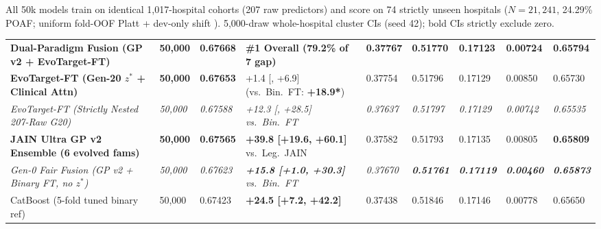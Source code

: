 \documentclass[8.5pt,letterpaper]{article}
\begin{document}

{\noindent\sffamily\fontsize{6.6}{8.1}\selectfont\color{sub}All 50k models train on identical 1,017-hospital cohorts (207 raw predictors) and score on 74 strictly unseen hospitals ($N=21{,}241$, 24.29\% POAF; uniform fold-OOF Platt + dev-only shift ). 5,000-draw whole-hospital cluster CIs (seed 42); bold CIs strictly exclude zero.\par}

\vspace{2.2pt}
\noindent
{\fontsize{7.0}{8.6}\selectfont\setlength{\tabcolsep}{2.5pt}
\begin{tabularx}{\textwidth}{@{}Y R{1.00cm} R{1.06cm} R{2.85cm} R{1.00cm} R{1.02cm} R{0.96cm} R{0.96cm} R{1.00cm}@{}}
\toprule
{} &  &  &  &  &  &  &  &  \\
\midrule
{}
\textbf{Dual-Paradigm Fusion (GP v2 + EvoTarget-FT)} & \textbf{50,000} & \textbf{0.67668} & \textbf{\#1 Overall (79.2\% of 7\x{} gap)} & \textbf{0.37767} & \textbf{0.51770} & \textbf{0.17123} & \textbf{0.00724} & \textbf{0.65794} \\
\textbf{\color{accent}EvoTarget-FT (Gen-20 $z^*$ + Clinical Attn)} & \textbf{50,000} & \textbf{0.67653} & +1.4 [, +6.9] (vs.\ Bin.\ FT: \textbf{+18.9*}) & 0.37754 & 0.51796 & 0.17129 & 0.00850 & 0.65730 \\
\textit{EvoTarget-FT (Strictly Nested 207-Raw G20)} & \textit{50,000} & \textit{0.67588} & \textit{+12.3 [, +28.5] vs.\ Bin.\ FT} & \textit{0.37637} & \textit{0.51797} & \textit{0.17129} & \textit{0.00742} & \textit{0.65535} \\
\textbf{\color{teal}JAIN Ultra GP v2 Ensemble (6 evolved fams)} & \textbf{50,000} & \textbf{0.67565} & \textbf{+39.8 [+19.6, +60.1]} vs.\ Leg.\ JAIN & 0.37582 & 0.51793 & 0.17135 & 0.00805 & \textbf{0.65809} \\
\textit{Gen-0 Fair Fusion (GP v2 + Binary FT, no $z^*$)} & \textit{50,000} & \textit{0.67623} & \textit{\textbf{+15.8 [+1.0, +30.3]} vs.\ Bin.\ FT} & \textit{0.37670} & \textit{\textbf{0.51761}} & \textit{\textbf{0.17119}} & \textit{\textbf{0.00460}} & \textit{\textbf{0.65873}} \\
\midrule
CatBoost (5-fold tuned binary ref) & 50,000 & 0.67423 & \textbf{+24.5 [+7.2, +42.2]} & 0.37438 & 0.51846 & 0.17146 & 0.00778 & 0.65650 \\

\end{tabularx}}
\end{document}
